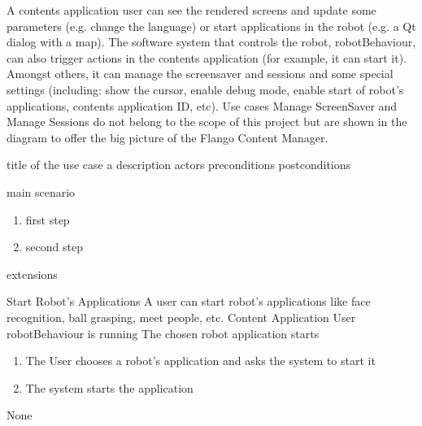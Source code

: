 A contents application user can see the rendered screens and update some parameters (e.g. change the language) or start applications in the robot (e.g. a Qt dialog with a map).
The software system that controls the robot, robotBehaviour, can also trigger actions in the contents application (for example, it can start it).
Amongst others, it can manage the screensaver and sessions and some special settings (including: show the cursor, enable debug mode, enable start of robot's applications, contents application ID, etc). 
Use cases Manage ScreenSaver and Manage Sessions do not belong to the scope of this project but are shown in the diagram to offer the big picture of the Flango Content Manager.

\begin{suc}
{title of the use case}
{a description}
{actors}
{preconditions}
{postconditions}
{main scenario
    \begin{enumerate}
        \item first step
        \item second step
    \end{enumerate}
}
{extensions}
\end{suc}

\begin{suc}
{Start Robot's Applications}
{A user can start robot's applications like face recognition, ball grasping, meet people, etc.}
{Content Application User}
{robotBehaviour is running}
{The chosen robot application starts}
{
    \begin{enumerate}
        \item The User chooses a robot's application and asks the system to start it
        \item The system starts the application
    \end{enumerate}
}
{None}
\end{suc}


